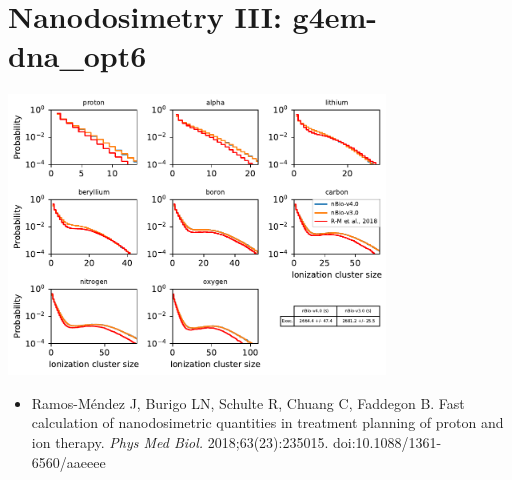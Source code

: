 \documentclass[aspectratio=1610]{beamer}
\begin{document}
\section{Nanodosimetry III: g4em-dna\_opt6}

\begin{frame}{\secname}
 \centering
   \includegraphics[width=0.75\textwidth]{./NanodosimetryIII/nanoIII_opt6}
\begin{itemize}
 \item \tiny{Ramos-M\'endez J, Burigo LN, Schulte R, Chuang C, Faddegon B. Fast calculation of nanodosimetric quantities in treatment planning of proton and ion therapy. \textit{Phys Med Biol.} 2018;63(23):235015. doi:10.1088/1361-6560/aaeeee}
\end{itemize}
\end{frame}
\end{document}
